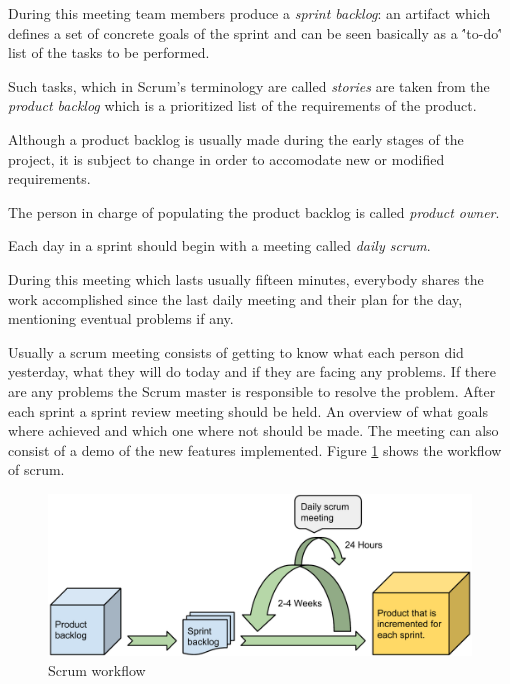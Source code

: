 During this meeting team members produce a \emph{sprint backlog}: an artifact which defines a set of concrete goals
of the sprint and can be seen basically as a \''to-do\'' list of the tasks to be performed.

Such tasks, which in Scrum's terminology are called \emph{stories} are taken from the
\emph{product backlog} which is a prioritized list of the requirements of the product.

Although a product backlog is usually made during the early stages of the project, it is subject to
change in order to accomodate new or modified requirements.

The person in charge of populating the product backlog is called \emph{product owner}.

Each day in a sprint should begin with a meeting called \emph{daily scrum}.

During this meeting which lasts usually fifteen minutes, everybody shares the work
accomplished since the last daily meeting and their plan for the day, mentioning eventual
problems if any.

 
Usually a scrum meeting consists of getting to know what each person did yesterday, what they will do today and if they are facing any problems.
If there are any problems the Scrum master is responsible to resolve the problem.
After each sprint a sprint review meeting should be held.
An overview of what goals where achieved and which one where not should be made.
The meeting can also consist of a demo of the new features implemented. 
Figure \ref{figure:scrum-workflow} shows the workflow of scrum.

\begin{figure}[h]
\begin{center}
\includegraphics[scale=0.5]{../Figures/Scrum-workflow.pdf}
\end{center}
\caption{Scrum workflow}
\label{figure:scrum-workflow}
\end{figure}

